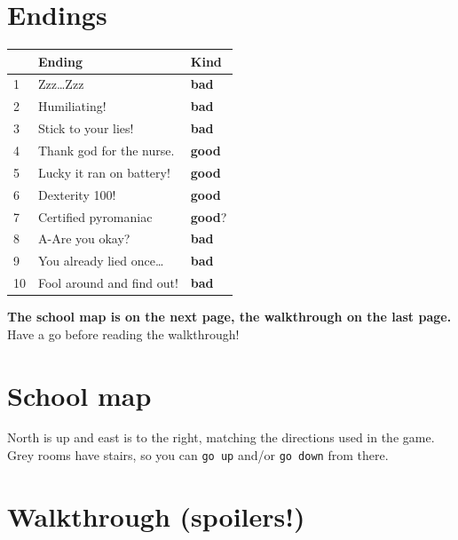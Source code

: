 \documentclass[11pt, a4paper]{article}
\newcommand{\cmd}[1]{\texttt{#1}}
\newcommand{\good}{\textcolor{green!45!black}{\textbf{good}}}
\newcommand{\bad}{\textcolor{alarm}{\textbf{bad}}}
\begin{document}
\section*{Endings}
\begin{center}
\begin{tabular}{@{}lll@{}}
  \toprule
  & Ending & Kind \\
  \midrule
  1  & Zzz\dots Zzz                   & \bad  \\
  2  & Humiliating!                   & \bad  \\
  3  & Stick to your lies!            & \bad  \\
  4  & Thank god for the nurse.       & \good \\
  5  & Lucky it ran on battery!       & \good \\
  6  & Dexterity 100!                 & \good \\
  7  & Certified pyromaniac           & \good? \\
  8  & A-Are you okay?                & \bad  \\
  9  & You already lied once\dots     & \bad  \\
  10 & Fool around and find out!      & \bad  \\
  \bottomrule
\end{tabular}
\end{center}

\noindent\textcolor{alarm}{\textbf{The school map is on the next page, the walkthrough on the last page.}}
Have a go before reading the walkthrough!

\newpage
\section*{School map}\label{sec:map}
North is up and east is to the right, matching the directions used in the game. Grey rooms
have stairs, so you can \cmd{go up} and/or \cmd{go down} from there.

\vspace{1em}
\begin{center}
  \resizebox{\textwidth}{!}{}
\end{center}

\newpage
\section*{Walkthrough \normalfont\small(spoilers!)}
\end{document}
